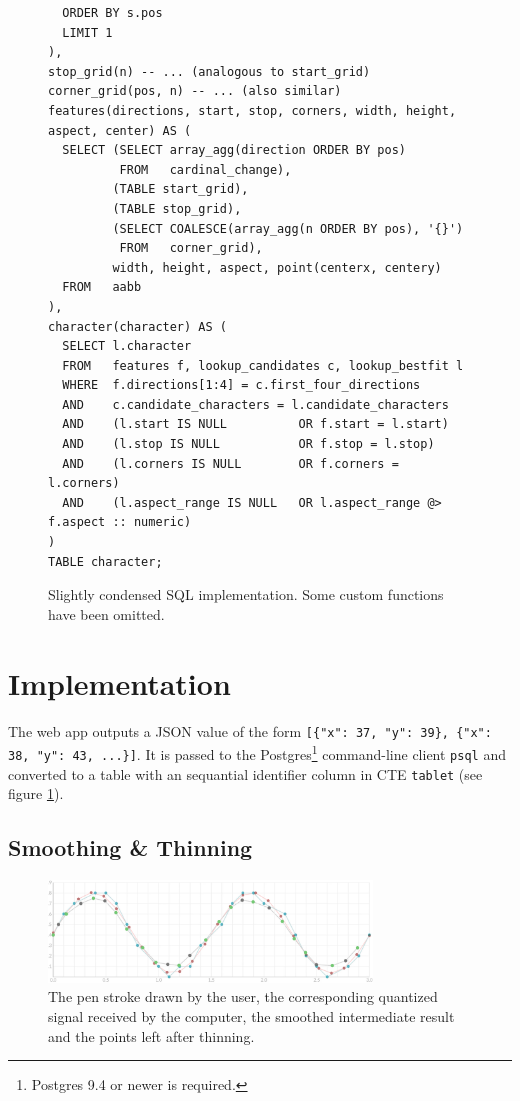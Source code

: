 \documentclass[sigconf]{acmart}
\begin{document}
\begin{figure}[tpb]
\begin{verbatim}
  ORDER BY s.pos
  LIMIT 1
),
stop_grid(n) -- ... (analogous to start_grid)
corner_grid(pos, n) -- ... (also similar)
features(directions, start, stop, corners, width, height, aspect, center) AS (
  SELECT (SELECT array_agg(direction ORDER BY pos)
          FROM   cardinal_change),
         (TABLE start_grid),
         (TABLE stop_grid),
         (SELECT COALESCE(array_agg(n ORDER BY pos), '{}')
          FROM   corner_grid),
         width, height, aspect, point(centerx, centery)
  FROM   aabb
),
character(character) AS (
  SELECT l.character
  FROM   features f, lookup_candidates c, lookup_bestfit l
  WHERE  f.directions[1:4] = c.first_four_directions
  AND    c.candidate_characters = l.candidate_characters
  AND    (l.start IS NULL          OR f.start = l.start)
  AND    (l.stop IS NULL           OR f.stop = l.stop)
  AND    (l.corners IS NULL        OR f.corners = l.corners)
  AND    (l.aspect_range IS NULL   OR l.aspect_range @> f.aspect :: numeric)
)
TABLE character;
  \end{verbatim}
  \caption{Slightly condensed SQL implementation. Some custom functions have been omitted.}
  \label{code}
\end{figure}

\section{Implementation}

The web app outputs a JSON value of the form \texttt{[\{"x": 37, "y": 39\}, \{"x": 38, "y": 43, ...\}]}. It is passed to the Postgres\footnote{Postgres 9.4 or newer is required.} command-line client \texttt{psql} and converted to a table with an sequantial identifier column in CTE \texttt{tablet} (see figure \ref{code}).

\subsection{Smoothing \& Thinning}

\begin{figure}[pb]
  \centering
  \includegraphics[width=8.6cm]{smoothingthinning}
  \caption{The {\color[HTML]{BE7777}\huge\textbullet} pen stroke drawn by the user, the corresponding {\color[HTML]{52B1C6}\huge\textbullet} quantized signal received by the computer, the {\color[HTML]{777777}\huge\textbullet} smoothed intermediate result and {\color[HTML]{74C974}\huge\textbullet} the points left after thinning.}
  \label{smoothingthinning}
\end{figure}
\end{document}

